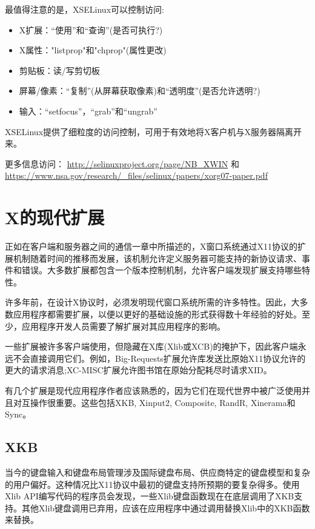 \noindent 最值得注意的是，XSELinux可以控制访问:

\begin{itemize}
	\item X扩展：“使用”和“查询”(是否可执行?)
	\item X属性："listprop"和"chprop"(属性更改)
	\item 剪贴板：读/写剪切板
	\item 屏幕/像素：“复制”(从屏幕获取像素)和“透明度”(是否允许透明?)
	\item 输入：“setfocus”，“grab”和“ungrab”
\end{itemize}

XSELinux提供了细粒度的访问控制，可用于有效地将X客户机与X服务器隔离开来。

\noindent 更多信息访问：
\url{http://selinuxproject.org/page/NB_XWIN}
和
\url{https://www.nsa.gov/research/_files/selinux/papers/xorg07-paper.pdf}

\section{X的现代扩展}

正如在客户端和服务器之间的通信一章中所描述的，X窗口系统通过X11协议的扩展机制随着时间的推移而发展，该机制允许定义服务器可能支持的新协议请求、事件和错误。大多数扩展都包含一个版本控制机制，允许客户端发现扩展支持哪些特性。

许多年前，在设计X协议时，必须发明现代窗口系统所需的许多特性。因此，大多数应用程序都需要扩展，以便以更好的基础设施的形式获得数十年经验的好处。至少，应用程序开发人员需要了解扩展对其应用程序的影响。

一些扩展被许多客户端使用，但隐藏在X库(Xlib或XCB)的掩护下，因此客户端永远不会直接调用它们。例如，Big-Requests扩展允许库发送比原始X11协议允许的更大的请求消息;XC-MISC扩展允许图书馆在原始分配耗尽时请求XID。

有几个扩展是现代应用程序作者应该熟悉的，因为它们在现代世界中被广泛使用并且对互操作很重要。这些包括XKB, Xinput2, Composite, RandR, Xinerama和Sync。

\subsection{XKB}

当今的键盘输入和键盘布局管理涉及国际键盘布局、供应商特定的键盘模型和复杂的用户偏好。这种情况比X11协议中最初的键盘支持所预期的要复杂得多。使用Xlib API编写代码的程序员会发现，一些Xlib键盘函数现在在底层调用了XKB支持。其他Xlib键盘调用已弃用，应该在应用程序中通过调用替换Xlib中的XKB函数来替换。

